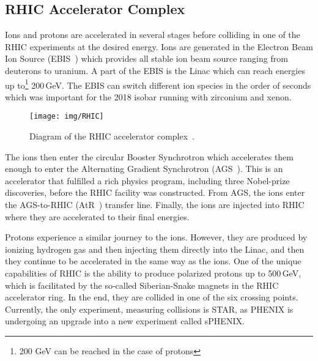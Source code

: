\subsection{RHIC Accelerator Complex}
Ions and protons are accelerated in several stages before colliding in one of the RHIC experiments at the desired energy. Ions are generated in the Electron Beam Ion Source (EBIS~\cite{EBIS}) which provides all stable ion beam source ranging from deuterons to uranium. A part of the EBIS is the Linac which can reach energies up to\footnote{200 GeV can be reached in the case of protons} 200$\,$GeV\@. The EBIS can switch different ion species in the order of seconds which was important for the 2018 isobar running with zirconium and xenon.

\begin{figure}[htb]
\begin{center}
 \texttt{[image: img/RHIC]}\\
\end{center}
\caption{\label{RHICcomplex}Diagram of the RHIC accelerator complex~\cite{RHICpages}.}
\end{figure}

The ions then enter the circular Booster Synchrotron which accelerates them enough to enter the Alternating Gradient Synchrotron (AGS~\cite{AGS}). This is an accelerator that fulfilled a rich physics program, including three Nobel-prize discoveries, before the RHIC facility was constructed. From AGS, the ions enter the AGS-to-RHIC (AtR~\cite{AtR}) transfer line. Finally, the ions are injected into RHIC where they are accelerated to their final energies. 

Protons experience a similar journey to the ions. However, they are produced by ionizing hydrogen gas and then injecting them directly into the Linac, and then they continue to be accelerated in the same way as the ions. One of the unique capabilities of RHIC is the ability to produce polarized protons up to 500$\,$GeV, which is facilitated by the so-called Siberian-Snake magnets in the RHIC accelerator ring. In the end, they are collided in one of the six crossing points. Currently, the only experiment, measuring collisions is STAR, as PHENIX is undergoing an upgrade into a new experiment called sPHENIX\@.





